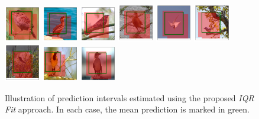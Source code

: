 \documentclass[letterpaper]{article} %
\begin{document}
\begin{figure}[t]
	\centering
	{\includegraphics[width=0.14\textwidth]{0.png}}
	{\includegraphics[width=0.14\textwidth]{4.png}}
	{\includegraphics[width=0.14\textwidth]{5.png}}
	{\includegraphics[width=0.14\textwidth]{1.png}}
	{\includegraphics[width=0.14\textwidth]{2.png}}
	{\includegraphics[width=0.14\textwidth]{3.png}}
	{\includegraphics[width=0.14\textwidth]{6.png}}
	{\includegraphics[width=0.14\textwidth]{7.png}}
	{\includegraphics[width=0.14\textwidth]{9.png}}

	\caption{Illustration of prediction intervals estimated using the proposed \textit{IQR Fit} approach. In each case, the mean prediction is marked in green.}
	\label{fig:obj}
\end{figure}
\end{document}
